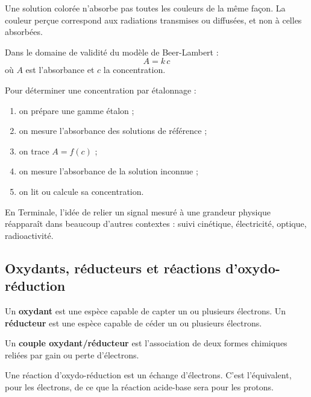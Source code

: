 \documentclass[11pt,a4paper]{article}
\begin{document}
\begin{sensbox}
Une solution colorée n'absorbe pas toutes les couleurs de la même façon.  
La couleur perçue correspond aux radiations transmises ou diffusées, et non à celles absorbées.
\end{sensbox}

\begin{proprbox}
Dans le domaine de validité du modèle de Beer-Lambert :
\[
A=k\,c
\]
où \(A\) est l'absorbance et \(c\) la concentration.
\end{proprbox}

\begin{methodebox}
Pour déterminer une concentration par étalonnage :
\begin{enumerate}
    \item on prépare une gamme étalon ;
    \item on mesure l'absorbance des solutions de référence ;
    \item on trace \(A=f(c)\) ;
    \item on mesure l'absorbance de la solution inconnue ;
    \item on lit ou calcule sa concentration.
\end{enumerate}
\end{methodebox}

\begin{terminalebox}
En Terminale, l'idée de relier un signal mesuré à une grandeur physique réapparaît dans beaucoup d'autres contextes : suivi cinétique, électricité, optique, radioactivité.
\end{terminalebox}

\subsection{Oxydants, réducteurs et réactions d'oxydo-réduction}

\begin{definitionbox}
Un \textbf{oxydant} est une espèce capable de capter un ou plusieurs électrons.  
Un \textbf{réducteur} est une espèce capable de céder un ou plusieurs électrons.
\end{definitionbox}

\begin{definitionbox}
Un \textbf{couple oxydant/réducteur} est l'association de deux formes chimiques reliées par gain ou perte d'électrons.
\end{definitionbox}

\begin{sensbox}
Une réaction d'oxydo-réduction est un échange d'électrons.  
C'est l'équivalent, pour les électrons, de ce que la réaction acide-base sera pour les protons.
\end{sensbox}
\end{document}
